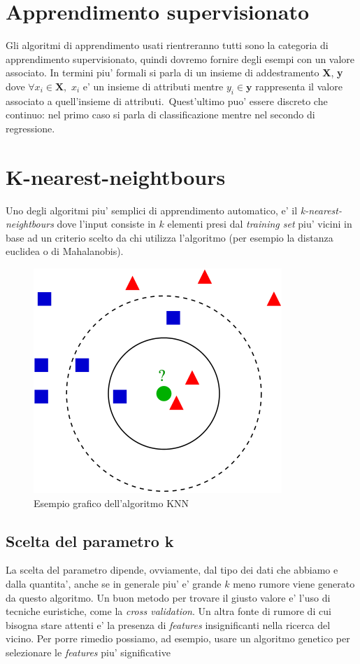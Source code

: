 \section*{Apprendimento supervisionato}
Gli algoritmi di apprendimento usati rientreranno tutti sono la categoria di apprendimento supervisionato, quindi dovremo fornire degli esempi con un valore associato. In termini piu' formali si parla di un insieme di addestramento \textbf{X}, \textbf{y} dove $\forall x_i \in \textbf{X},\,\,x_i$ e' un insieme di attributi mentre $y_i \in \textbf{y}$ rappresenta il valore associato a quell'insieme di attributi.\ Quest'ultimo puo' essere discreto che continuo: nel primo caso si parla di classificazione mentre nel secondo di regressione.\\

\section*{K-nearest-neightbours}
Uno degli algoritmi piu' semplici di apprendimento automatico, e' il \textit{k-nearest-neightbours} dove l'input consiste in $k$ elementi presi dal \textit{training set} piu' vicini in base ad un criterio scelto da chi utilizza l'algoritmo (per esempio la distanza euclidea o di Mahalanobis).


\begin{figure}[H]
	\centering
	\includegraphics[width=0.7\linewidth]{img/knn_example}
	\caption{Esempio grafico dell'algoritmo KNN}
	\label{fig:knnexample}
\end{figure}


\subsection*{Scelta del parametro k}
La scelta del parametro dipende, ovviamente, dal tipo dei dati che abbiamo e dalla quantita', anche se in generale piu' e' grande $k$ meno rumore viene generato da questo algoritmo. Un buon metodo per trovare il giusto valore e' l'uso di tecniche euristiche, come la \textit{cross validation}. Un altra fonte di rumore di cui bisogna stare attenti e' la presenza di \textit{features} insignificanti nella ricerca del vicino. Per porre rimedio possiamo, ad esempio, usare un algoritmo genetico per selezionare le \textit{features} piu' significative

